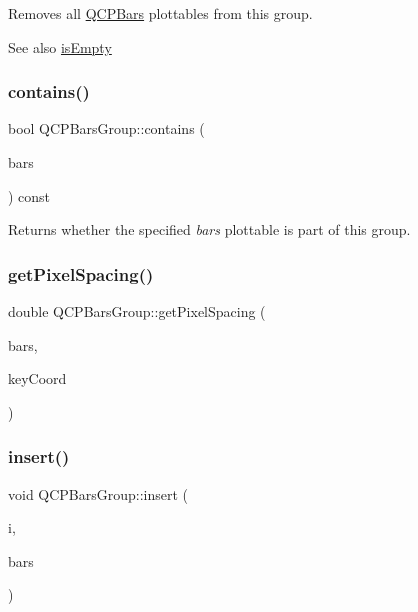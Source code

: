 Removes all \mbox{\hyperlink{class_q_c_p_bars}{Q\+C\+P\+Bars}} plottables from this group.

\begin{DoxySeeAlso}{See also}
\mbox{\hyperlink{class_q_c_p_bars_group_aac959e79e852e8ef9aea6e0449ad000a}{is\+Empty}} 
\end{DoxySeeAlso}
\mbox{\label{class_q_c_p_bars_group_ae26da07a23553052a178fb3fae90d0dc}} 
\subsubsection{\texorpdfstring{contains()}{contains()}}
{\footnotesize\ttfamily bool Q\+C\+P\+Bars\+Group\+::contains (\begin{DoxyParamCaption}\item[{\mbox{\hyperlink{class_q_c_p_bars}{Q\+C\+P\+Bars}} $\ast$}]{bars }\end{DoxyParamCaption}) const\hspace{0.3cm}{\ttfamily [inline]}}

Returns whether the specified {\itshape bars} plottable is part of this group. \mbox{\label{class_q_c_p_bars_group_a0beccd41bc3841a4c5b284823bc7d2de}} 
\subsubsection{\texorpdfstring{getPixelSpacing()}{getPixelSpacing()}}
{\footnotesize\ttfamily double Q\+C\+P\+Bars\+Group\+::get\+Pixel\+Spacing (\begin{DoxyParamCaption}\item[{const \mbox{\hyperlink{class_q_c_p_bars}{Q\+C\+P\+Bars}} $\ast$}]{bars,  }\item[{double}]{key\+Coord }\end{DoxyParamCaption})\hspace{0.3cm}{\ttfamily [protected]}}

\mbox{\label{class_q_c_p_bars_group_a309a5f7233db189f3ea9c2d04ece6c13}} 
\subsubsection{\texorpdfstring{insert()}{insert()}}
{\footnotesize\ttfamily void Q\+C\+P\+Bars\+Group\+::insert (\begin{DoxyParamCaption}\item[{int}]{i,  }\item[{\mbox{\hyperlink{class_q_c_p_bars}{Q\+C\+P\+Bars}} $\ast$}]{bars }\end{DoxyParamCaption})}

